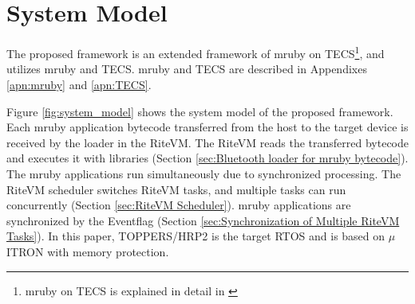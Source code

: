 \documentclass[conference]{IEEEtran/IEEEtran/IEEEtran}
\begin{document}
%
%
%
%
%

\section{System Model}
\label{sec:System Model}
The proposed framework is an extended framework of mruby on TECS\footnote{mruby on TECS is explained in detail in \cite{par:mrubyonTECS}}, and utilizes mruby and TECS.
mruby and TECS are described in Appendixes \ref{apn:mruby} and \ref{apn:TECS}.

Figure \ref{fig:system_model} shows the system model of the proposed framework.
Each mruby application bytecode transferred from the host to the target device is received by the loader in the RiteVM.
The RiteVM reads the transferred bytecode and executes it with libraries (Section \ref{sec:Bluetooth loader for mruby bytecode}).
The mruby applications run simultaneously due to synchronized processing.
The RiteVM scheduler switches RiteVM tasks, and multiple tasks can run concurrently (Section \ref{sec:RiteVM Scheduler}).
mruby applications are synchronized by the Eventflag (Section \ref{sec:Synchronization of Multiple RiteVM Tasks}).
In this paper, TOPPERS/HRP2 \cite{par:hr-tecs} is the target RTOS and is based on $\mu$ITRON \cite{par:microITRON} with memory protection.
\end{document}
